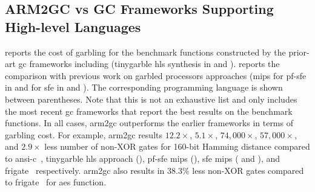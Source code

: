 \subsection{ARM2GC vs GC Frameworks Supporting High-level Languages}
 reports the cost of garbling for the benchmark functions constructed by the prior-art \acrshort{gc} frameworks including (\gls{tinygarble} \acrshort{hls} synthesis in  and \cite{holzer2012secure, mood2016frigate}).
 reports the comparison with previous work on garbled processors approaches (\gls{mips} for \acrshort{pf-sfe} in  and for \acrshort{sfe} in  and \cite{wang2016secure}).
The corresponding programming language is shown between parentheses.
Note that this is not an exhaustive list and only includes the most recent \acrshort{gc} frameworks that report the best results on the benchmark functions.
In all cases, \gls{arm2gc} outperforms the earlier frameworks in terms of garbling cost.
For example, \gls{arm2gc} results $12.2\times$,  $5.1\times$, $74,000\times$, $57,000\times$, and $2.9\times$ less number of non-XOR gates for 160-bit Hamming distance compared to \acrshort{ansi}-\gls{c}~\cite{holzer2012secure}, \gls{tinygarble} \acrshort{hls} approach (), \acrshort{pf-sfe} \gls{mips} (), \acrshort{sfe} \gls{mips} ( and \cite{wang2016secure}), and \gls{frigate}~\cite{mood2016frigate} respectively.
\gls{arm2gc} also results in $38.3\%$ less non-XOR gates compared to \gls{frigate}~\cite{mood2016frigate} for \acrshort{aes} function.

